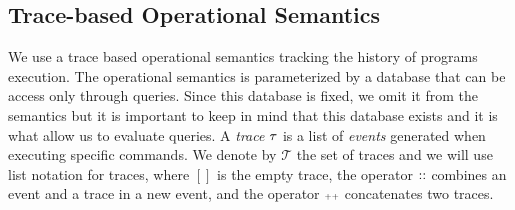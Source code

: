 \subsection{ Trace-based Operational Semantics}
We use a trace based operational semantics tracking the history of programs execution. The operational semantics is parameterized by a database that can be access only through queries. Since this database is fixed, we omit it from the semantics but it is important to keep in mind that this database exists and it is what allow us to evaluate queries.
A \emph{trace}
$\mathtt{\tau}$ is a list of \emph{events} generated when executing specific commands. We denote by $\mathcal{T}$ the set of traces and we will use list notation for traces, where $[]$ is the empty trace, the operator ${\small ::}$ combines an event and a trace in a new event, 
and the operator ${\scriptscriptstyle ++}$ concatenates two traces. 

